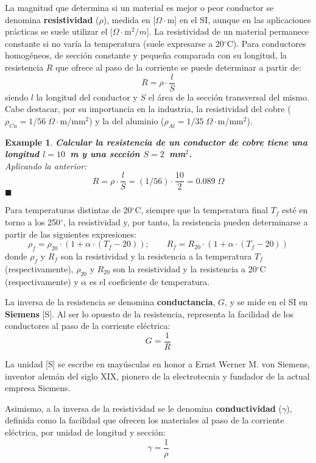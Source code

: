 \documentclass[11pt]{book} %
\numberwithin{dummy}{section}
\theoremstyle{ocrenumbox}
\theoremstyle{blacknumex}
\newtheorem{exampleT}{Example}[chapter]
\theoremstyle{blacknumbox}
\theoremstyle{ocrenum}
\newenvironment{example}{\begin{exampleT}}{\hfill{\tiny\ensuremath{\blacksquare}}\end{exampleT}}
\newenvironment{remark}{\par\vspace{10pt}\small %
\begin{list}{}{
\leftmargin=35pt %
\rightmargin=25pt}\item\ignorespaces %
\makebox[-2.5pt]{\begin{tikzpicture}[overlay]
\node[draw=ocre!60,line width=1pt,circle,fill=ocre!25,font=\sffamily\bfseries,inner sep=2pt,outer sep=0pt] at (-15pt,0pt){\textcolor{ocre}{N}};\end{tikzpicture}} %
\advance\baselineskip -1pt}{\end{list}\vskip5pt} %
\newlength\esp
\begin{document}
	La magnitud que determina si un material es mejor o peor conductor se denomina \textbf{resistividad} ($\rho$), medida en [$\Omega\cdot$m] en el SI, aunque en las aplicaciones prácticas se suele utilizar el [$\Omega\cdot$m$^2/m$]. La resistividad de un material permanece constante si no varía la temperatura (suele expresarse a 20$^\circ$C). Para conductores homogéneos, de sección constante y pequeña comparada con su longitud, la resistencia $R$ que ofrece al paso de la corriente se puede determinar a partir de: 
	\begin{equation*}\label{eq.resistencia_rho}
		R=\rho\cdot \dfrac{l}{S}
	\end{equation*}
	siendo $l$ la longitud del conductor y $S$ el área de la sección transversal del mismo. Cabe destacar, por su importancia en la industria, la resistividad del cobre ($\rho_{Cu}=1/56\;\Omega \cdot$m/mm$^2$) y la del aluminio ($\rho_{Al}=1/35\;\Omega \cdot$m/mm$^2$).
	
	\vspace{4mm}
	\begin{example}
		\textbf{Calcular la resistencia de un conductor de cobre tiene una longitud $l=10$~m y una sección $S=2$~mm$^2$.}\\
		Aplicando la anterior: 
		\begin{equation*}
			R=\rho\cdot \dfrac{l}{S}=(1/56)\cdot \dfrac{10}{2}=0.089\;\Omega
		\end{equation*}
	\end{example}
	
	Para temperaturas distintas de 20$^\circ$C, siempre que la temperatura final $T_f$ esté en torno a los 250$^\circ$, la resistividad y, por tanto, la resistencia pueden determinarse a partir de las siguientes expresiones:
	\begin{equation*}
		\rho_f=\rho_{20}\cdot (1+\alpha\cdot (T_f-20)); \qquad
		R_f=R_{20}\cdot (1+\alpha\cdot (T_f-20))
	\end{equation*}
	donde $\rho_f$ y $R_f$ son la resistividad y la resistencia a la temperatura $T_f$ (respectivamente), $\rho_{20}$ y $R_{20}$ son la resistividad y la resistencia a 20$^\circ$C (respectivamente) y $\alpha$ es el coeficiente de temperatura. 
	
	La inversa de la resistencia se denomina \textbf{conductancia}, $G$, y se mide en el SI en \textbf{Siemens} [S]. Al ser lo opuesto de la resistencia, representa la facilidad de los conductores al paso de la corriente eléctrica:
	\begin{equation}
		\boxed{G=\dfrac{1}{R}}
	\end{equation}
	\begin{remark}
		La unidad [S] se escribe en mayúsculas en honor a Ernst Werner M. von Siemens, inventor alemán del siglo XIX, pionero de la electrotecnia y fundador de la actual empresa Siemens.
	\end{remark}
	Asimismo, a la inversa de la resistividad se le denomina \textbf{conductividad} ($\gamma$), definida como la facilidad que ofrecen los materiales al paso de la corriente eléctrica, por unidad de longitud y sección:
	\begin{equation*}
		\gamma=\dfrac{1}{\rho}
	\end{equation*}
	
\end{document}
